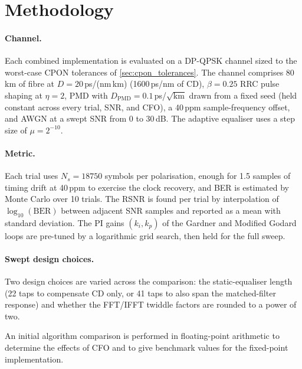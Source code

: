 \documentclass[12pt,a4paper]{report}
\begin{document}
\section{Methodology}\label{sec:eqclk_methodology}
\paragraph{Channel.} Each combined implementation is evaluated on a DP-QPSK channel sized to the worst-case CPON tolerances of \cref{sec:cpon_tolerances}. The channel comprises 80\,km of fibre at $D = 20$\,ps/(nm\,km) (1600\,ps/nm of CD), $\beta = 0.25$ RRC pulse shaping at $\eta = 2$, PMD with $D_\mathrm{PMD} = 0.1$\,ps/$\sqrt{\mathrm{km}}$ drawn from a fixed seed (held constant across every trial, SNR, and CFO), a 40\,ppm sample-frequency offset, and AWGN at a swept SNR from 0 to 30\,dB. The adaptive equaliser uses a step size of $\mu = 2^{-10}$.

\paragraph{Metric.} Each trial uses $N_s = 18750$ symbols per polarisation, enough for 1.5 samples of timing drift at 40\,ppm to exercise the clock recovery, and BER is estimated by Monte Carlo over 10 trials. The RSNR is found per trial by interpolation of $\log_{10}(\mathrm{BER})$ between adjacent SNR samples and reported as a mean with standard deviation. The PI gains $(k_i, k_p)$ of the Gardner and Modified Godard loops are pre-tuned by a logarithmic grid search, then held for the full sweep.

\paragraph{Swept design choices.} Two design choices are varied across the comparison: the static-equaliser length (22 taps to compensate CD only, or 41 taps to also span the matched-filter response) and whether the FFT/IFFT twiddle factors are rounded to a power of two.

An initial algorithm comparison is performed in floating-point arithmetic to determine the effects of CFO and to give benchmark values for the fixed-point implementation.
\end{document}
